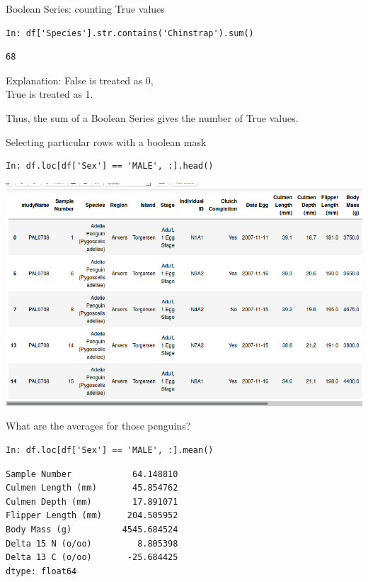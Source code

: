 \documentclass[aspectratio=169,usenames,dvipsnames]{beamer}
\begin{document}
\begin{frame}[fragile]{Boolean Series: counting True values}
\begin{lstlisting}
In: df['Species'].str.contains('Chinstrap').sum()
\end{lstlisting}\vspace{-1em}\begin{lstlisting}[style=plain]
68
\end{lstlisting}

\pause
Explanation:
False is treated as 0,\\
True is treated as 1.

Thus, the sum of a Boolean Series gives the number of True values.
\end{frame}

\begin{frame}[fragile]{Selecting particular rows with a boolean mask}
\vspace{-0.5em}
\begin{lstlisting}
In: df.loc[df['Sex'] == 'MALE', :].head()
\end{lstlisting}

\vspace{-0.5em}
\includegraphics[height=0.75\textheight]{fig/penguinsmale}
\end{frame}

\begin{frame}[fragile]{What are the averages for those penguins?}
\vspace{-0.5em}
\begin{lstlisting}
In: df.loc[df['Sex'] == 'MALE', :].mean()
\end{lstlisting}\vspace{-1em}\begin{lstlisting}[style=plain]
Sample Number            64.148810
Culmen Length (mm)       45.854762
Culmen Depth (mm)        17.891071
Flipper Length (mm)     204.505952
Body Mass (g)          4545.684524
Delta 15 N (o/oo)         8.805398
Delta 13 C (o/oo)       -25.684425
dtype: float64
\end{lstlisting}
\end{frame}
\end{document}
